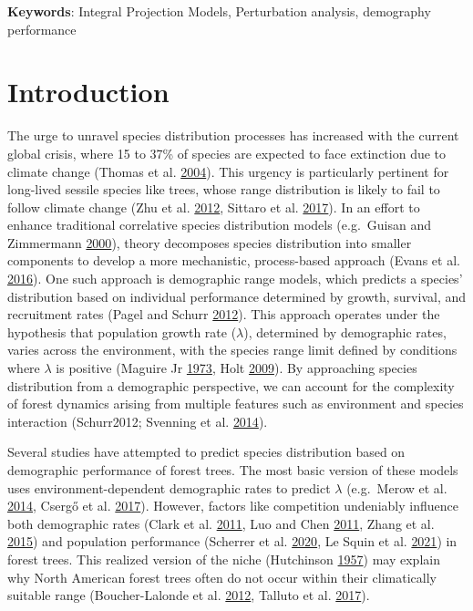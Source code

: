 \documentclass[12pt]{article}
\begin{document}
\hspace{1cm}\small{{\bf Keywords}: Integral Projection
Models, Perturbation analysis, demography performance}



\hypertarget{introduction}{%
\section{Introduction}\label{introduction}}

The urge to unravel species distribution processes has increased with
the current global crisis, where 15 to 37\% of species are expected to
face extinction due to climate change (Thomas et al.
\protect\hyperlink{ref-thomas2004}{2004}). This urgency is particularly
pertinent for long-lived sessile species like trees, whose range
distribution is likely to fail to follow climate change (Zhu et al.
\protect\hyperlink{ref-Zhu2012}{2012}, Sittaro et al.
\protect\hyperlink{ref-Sittaro2017}{2017}). In an effort to enhance
traditional correlative species distribution models (e.g.~Guisan and
Zimmermann \protect\hyperlink{ref-Guisan2000}{2000}), theory decomposes
species distribution into smaller components to develop a more
mechanistic, process-based approach (Evans et al.
\protect\hyperlink{ref-Evans2016}{2016}). One such approach is
demographic range models, which predicts a species' distribution based
on individual performance determined by growth, survival, and
recruitment rates (Pagel and Schurr
\protect\hyperlink{ref-Pagel2012}{2012}). This approach operates under
the hypothesis that population growth rate (\(\lambda\)), determined by
demographic rates, varies across the environment, with the species range
limit defined by conditions where \(\lambda\) is positive (Maguire Jr
\protect\hyperlink{ref-maguire1973niche}{1973}, Holt
\protect\hyperlink{ref-Holt2009}{2009}). By approaching species
distribution from a demographic perspective, we can account for the
complexity of forest dynamics arising from multiple features such as
environment and species interaction (Schurr2012; Svenning et al.
\protect\hyperlink{ref-Svenning2014}{2014}).

Several studies have attempted to predict species distribution based on
demographic performance of forest trees. The most basic version of these
models uses environment-dependent demographic rates to predict
\(\lambda\) (e.g.~Merow et al. \protect\hyperlink{ref-Merow2014}{2014},
Csergő et al. \protect\hyperlink{ref-Csergo2017}{2017}). However,
factors like competition undeniably influence both demographic rates
(Clark et al. \protect\hyperlink{ref-Clark2011}{2011}, Luo and Chen
\protect\hyperlink{ref-Luo2011}{2011}, Zhang et al.
\protect\hyperlink{ref-Zhang2015}{2015}) and population performance
(Scherrer et al. \protect\hyperlink{ref-Scherrer2020}{2020}, Le Squin et
al. \protect\hyperlink{ref-LeSquin2021}{2021}) in forest trees. This
realized version of the niche (Hutchinson
\protect\hyperlink{ref-Hutchinson1957}{1957}) may explain why North
American forest trees often do not occur within their climatically
suitable range (Boucher-Lalonde et al.
\protect\hyperlink{ref-BoucherLalonde2012}{2012}, Talluto et al.
\protect\hyperlink{ref-Talluto2017}{2017}).
\end{document}
